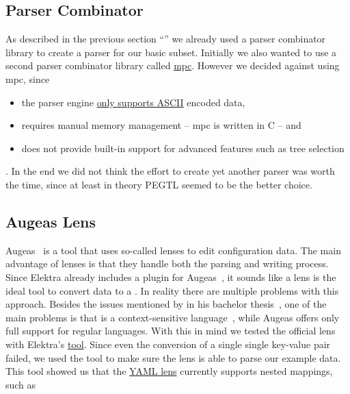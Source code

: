 \subsection{Parser Combinator}

As described in the previous section “” we already used a parser combinator library to create a parser for our basic  subset. Initially we also wanted to use a second parser combinator library called \href{https://github.com/orangeduck/mpc}{mpc}. However we decided against using mpc, since

\begin{itemize}
  \item the parser engine \href{https://github.com/orangeduck/mpc#does-mpc-support-unicode}{only supports ASCII} encoded data,
  \item requires manual memory management – mpc is written in C – and
  \item does not provide built-in support for advanced features such as tree selection
\end{itemize}

. In the end we did not think the effort to create yet another parser was worth the time, since at least in theory \gls{PEGTL} seemed to be the better choice.

\subsection{Augeas Lens}

Augeas~\cite{lutterkort2008augeas} is a tool that uses so-called
lenses to edit configuration data. The main advantage of lenses is that they
handle both the parsing and writing process. Since Elektra already includes a
plugin for Augeas~\cite{berlakovich2016universal}, it sounds like a 
lens is the ideal tool to convert  data to a . In reality there
are multiple problems with this approach. Besides the issues mentioned by
\citeauthor{berlakovich2016universal} in his bachelor thesis~\cite{berlakovich2016universal}, one of
the main problems is that  is a context-sensitive
language~\cite{lutterkort2017augeas}, while Augeas offers only full support for
regular languages. With this in mind we tested the official  lens with Elektra’s \href{https://www.libelektra.org/manpages/kdb}{ tool}. Since even the conversion of a single single key-value pair failed, we used the tool \href{https://github.com/raphink/augeas-sandbox/blob/master/augcheck}{} to make sure the  lens is able to parse our example data. This tool showed us that the \href{https://github.com/hercules-team/augeas/blob/d555a995a06ac81cab62d016d6eaff8a7ba64a2e/lenses/tests/test_yaml.aug}{YAML lens} currently supports nested mappings, such as

